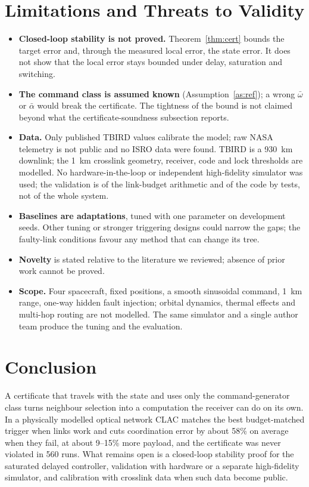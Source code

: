 \documentclass[journal]{IEEEtran}
\begin{document}
\section{Limitations and Threats to Validity}\label{sec:limits}
\begin{itemize}
\item \textbf{Closed-loop stability is not proved.} Theorem~\ref{thm:cert} bounds the target error and, through the measured local error, the state error. It does not show that the local error stays bounded under delay, saturation and switching.
\item \textbf{The command class is assumed known} (Assumption~\ref{as:ref}); a wrong $\bar\omega$ or $\bar\alpha$ would break the certificate. The tightness of the bound is not claimed beyond what the certificate-soundness subsection reports.
\item \textbf{Data.} Only published TBIRD values calibrate the model; raw NASA telemetry is not public and no ISRO data were found. TBIRD is a 930~km downlink; the 1~km crosslink geometry, receiver, code and lock thresholds are modelled. No hardware-in-the-loop or independent high-fidelity simulator was used; the validation is of the link-budget arithmetic and of the code by tests, not of the whole system.
\item \textbf{Baselines are adaptations}, tuned with one parameter on development seeds. Other tuning or stronger triggering designs could narrow the gaps; the faulty-link conditions favour any method that can change its tree.
\item \textbf{Novelty} is stated relative to the literature we reviewed; absence of prior work cannot be proved.
\item \textbf{Scope.} Four spacecraft, fixed positions, a smooth sinusoidal command, 1~km range, one-way hidden fault injection; orbital dynamics, thermal effects and multi-hop routing are not modelled. The same simulator and a single author team produce the tuning and the evaluation.
\end{itemize}

\section{Conclusion}
A certificate that travels with the state and uses only the command-generator class turns neighbour selection into a computation the receiver can do on its own. In a physically modelled optical network CLAC matches the best budget-matched trigger when links work and cuts coordination error by about 58\% on average when they fail, at about 9--15\% more payload, and the certificate was never violated in 560 runs. What remains open is a closed-loop stability proof for the saturated delayed controller, validation with hardware or a separate high-fidelity simulator, and calibration with crosslink data when such data become public.
\end{document}
